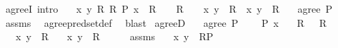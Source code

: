 \begin{isabellebody}
{\isafoldproof}%
%
\isadelimproof
\isanewline
%
\endisadelimproof
\isanewline
{}\isamarkupfalse%
\ agreeI\ {\isacharbrackleft}{\kern0pt}intro{\isacharbrackright}{\kern0pt}{\isacharcolon}{\kern0pt}\isanewline
\ \ \ {\isachardoublequoteopen}{\isasymAnd}x\ y\ R\ R{\isacharprime}{\kern0pt}{\isachardot}{\kern0pt}\ P\ x\ {\isasymLongrightarrow}\ R\ {\isasymin}\ {\isasymR}\ {\isasymLongrightarrow}\ R{\isacharprime}{\kern0pt}\ {\isasymin}\ {\isasymR}\ {\isasymLongrightarrow}\ {\isasymlangle}x{\isacharcomma}{\kern0pt}\ y{\isasymrangle}\ {\isasymin}\ R\ {\isasymLongrightarrow}\ {\isasymlangle}x{\isacharcomma}{\kern0pt}\ y{\isasymrangle}\ {\isasymin}\ R{\isacharprime}{\kern0pt}{\isachardoublequoteclose}\isanewline
\ \ \ {\isachardoublequoteopen}agree\ P\ {\isasymR}{\isachardoublequoteclose}\isanewline
%
\isadelimproof
\ \ %
\endisadelimproof
%
\isatagproof
{}\isamarkupfalse%
\ assms\ \isamarkupfalse%
\ agree{\isacharunderscore}{\kern0pt}pred{\isacharunderscore}{\kern0pt}set{\isacharunderscore}{\kern0pt}def\ \isamarkupfalse%
\ blast%
\endisatagproof
{\isafoldproof}%
%
\isadelimproof
\isanewline
%
\endisadelimproof
\isanewline
{}\isamarkupfalse%
\ agreeD{\isacharcolon}{\kern0pt}\isanewline
\ \ \ {\isachardoublequoteopen}agree\ P\ {\isasymR}{\isachardoublequoteclose}\isanewline
\ \ \ {\isachardoublequoteopen}P\ x{\isachardoublequoteclose}\isanewline
\ \ \ {\isachardoublequoteopen}R\ {\isasymin}\ {\isasymR}{\isachardoublequoteclose}\ {\isachardoublequoteopen}R{\isacharprime}{\kern0pt}\ {\isasymin}\ {\isasymR}{\isachardoublequoteclose}\isanewline
\ \ \ {\isachardoublequoteopen}{\isasymlangle}x{\isacharcomma}{\kern0pt}\ y{\isasymrangle}\ {\isasymin}\ R{\isachardoublequoteclose}\isanewline
\ \ \ {\isachardoublequoteopen}{\isasymlangle}x{\isacharcomma}{\kern0pt}\ y{\isasymrangle}\ {\isasymin}\ R{\isacharprime}{\kern0pt}{\isachardoublequoteclose}\isanewline
%
\isadelimproof
%
\endisadelimproof
%
\isatagproof
{}\isamarkupfalse%
\ {\isacharminus}{\kern0pt}\isanewline
\ \ \isamarkupfalse%
\ assms{\isacharparenleft}{\kern0pt}{}{\isacharcomma}{\kern0pt}\ {}{\isacharparenright}{\kern0pt}\ \isamarkupfalse%
\ {\isachardoublequoteopen}{\isasymlangle}x{\isacharcomma}{\kern0pt}\ y{\isasymrangle}\ {\isasymin}\ R{\isasymrestriction}\isactrlbsub P\isactrlesub {\isachardoublequoteclose}\ \isamarkupfalse%

\end{isabellebody}
